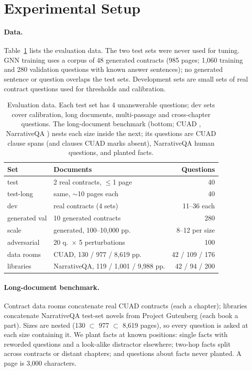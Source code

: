 \documentclass[11pt]{article}
\begin{document}
\section{Experimental Setup}

\paragraph{Data.} Table~\ref{tab:data} lists the evaluation data. The two test sets were never used for tuning. GNN training uses a corpus of 48 generated contracts (985 pages; 1,060 training and 280 validation questions with known answer sentences); no generated sentence or question overlaps the test sets. Development sets are small sets of real contract questions used for thresholds and calibration.

\begin{table}[t]
\centering
\scriptsize
\setlength{\tabcolsep}{3pt}
\begin{tabular}{@{}llr@{}}
\toprule
\textbf{Set} & \textbf{Documents} & \textbf{Questions} \\
\midrule
test & 2 real contracts, $\leq$1 page & 40 \\
test-long & same, $\sim$10 pages each & 40 \\
dev & real contracts (4 sets) & 11--36 each \\
generated val & 10 generated contracts & 280 \\
scale & generated, 100--10,000 pp. & 8--12 per size \\
adversarial & 20 q.\ $\times$ 5 perturbations & 100 \\
\midrule
data rooms & CUAD, 130 / 977 / 8,619 pp. & 42 / 109 / 176 \\
libraries & NarrativeQA, 119 / 1,001 / 9,988 pp. & 42 / 94 / 200 \\
\bottomrule
\end{tabular}
\caption{Evaluation data. Each test set has 4 unanswerable questions; dev sets cover calibration, long documents, multi-passage and cross-chapter questions. The long-document benchmark (bottom; CUAD \citep{hendrycks2021cuad}, NarrativeQA \citep{kocisky2018narrativeqa}) nests each size inside the next; its questions are CUAD clause spans (and clauses CUAD marks absent), NarrativeQA human questions, and planted facts.}
\label{tab:data}
\end{table}

\paragraph{Long-document benchmark.} Contract data rooms concatenate real CUAD contracts (each a chapter); libraries concatenate NarrativeQA test-set novels from Project Gutenberg (each book a part). Sizes are nested (130 $\subset$ 977 $\subset$ 8,619 pages), so every question is asked at each size containing it. We plant facts at known positions: single facts with reworded questions and a look-alike distractor elsewhere; two-hop facts split across contracts or distant chapters; and questions about facts never planted. A page is 3,000 characters.
\end{document}

